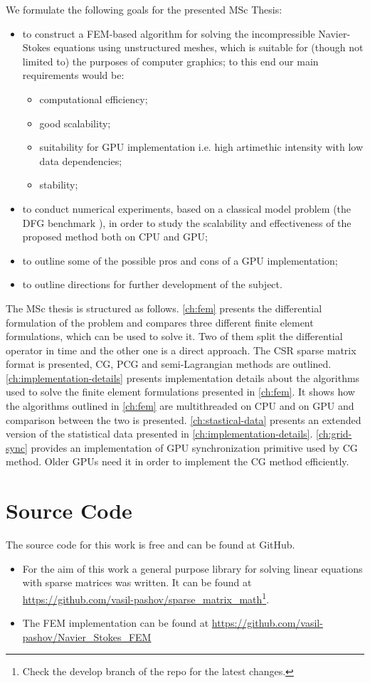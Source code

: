 We formulate the following goals for the presented MSc Thesis:
\begin{itemize}
	\item to construct a FEM-based algorithm for solving the incompressible Navier-Stokes equations using unstructured meshes, which is suitable for (though not limited to) the purposes of computer graphics; to this end our main requirements would be:
	\begin{itemize}
		\item computational efficiency;
		\item good scalability;
		\item suitability for GPU implementation i.e. high artimethic intensity with low data dependencies;
		\item stability;
	\end{itemize}
	\item to conduct numerical experiments, based on a classical model problem (the DFG benchmark \cite{dfg-problem}), in order to study the scalability and effectiveness of the proposed method both on CPU and GPU;
	\item to outline some of the possible pros and cons of a GPU implementation;
	\item to outline directions for further development of the subject.
\end{itemize}
The MSc thesis is structured as follows. \cref{ch:fem} presents the differential formulation of the problem and compares three different finite element formulations, which can be used to solve it. Two of them split the differential operator in time and the other one is a direct approach. The CSR sparse matrix format is presented, CG, PCG and semi-Lagrangian methods are outlined. \cref{ch:implementation-details} presents implementation details about the algorithms used to solve the finite element formulations presented in \cref{ch:fem}. It shows how the algorithms outlined in \cref{ch:fem} are multithreaded on CPU and on GPU and comparison between the two is presented. \cref{ch:stastical-data} presents an extended version of the statistical data presented in \cref{ch:implementation-details}. \cref{ch:grid-sync} provides an implementation of GPU synchronization primitive used by CG method. Older GPUs need it in order to implement the CG method efficiently.

\section{Source Code}
The source code for this work is free and can be found at GitHub.
\begin{itemize}
	\item For the aim of this work a general purpose library for solving linear equations with sparse matrices was written. It can be found at \url{https://github.com/vasil-pashov/sparse_matrix_math}\footnote{Check the develop branch of the repo for the latest changes.}.
	\item The FEM implementation can be found at \url{https://github.com/vasil-pashov/Navier_Stokes_FEM}
\end{itemize}